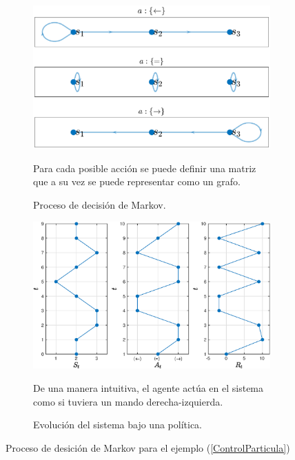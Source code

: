 \begin{example}
    
    \begin{figure}
        \begin{subfigure}[b]{0.4\textwidth}
            \includegraphics[scale=0.435]{img/particula_estocastica_MDP.eps}
            \caption{Proceso de decisión de Markov.}{\small Para cada posible acción se puede definir una matriz que a su vez se puede representar como un grafo.}
            \label{graphMDP}
        \end{subfigure}
        \hspace{1.75cm}
        \begin{subfigure}[b]{0.4\textwidth}
            \includegraphics[scale=0.435]{img/MDP_evolution.eps}
            \caption{Evolución del sistema bajo una política.}{\small De una manera intuitiva, el agente actúa en el sistema como si tuviera un mando derecha-izquierda.}
            \label{EvolutionMDP}
        \end{subfigure}   
        \hfill
        \caption{Proceso de desición de Markov para el ejemplo (\ref{ControlParticula}) }
        \label{MDPfig}
    \end{figure}
 



\end{example}
